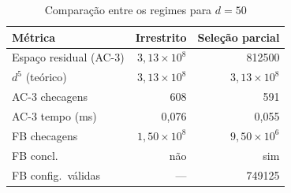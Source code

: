 \begin{table}[htbp]
  \centering
  \caption{Comparação entre os regimes para $d = 50$}
  \label{tab:bench-comparativa}
  \begin{tabular}{lrr}
    \toprule
    Métrica                & Irrestrito           & Seleção parcial      \\
    \midrule
    Espaço residual (AC-3) & $3{,}13\times10^{8}$ & 812500               \\
    $d^5$ (teórico)        & $3{,}13\times10^{8}$ & $3{,}13\times10^{8}$ \\
    AC-3 checagens         & 608                  & 591                  \\
    AC-3 tempo (ms)        & 0,076                & 0,055                \\
    FB checagens           & $1{,}50\times10^{8}$ & $9{,}50\times10^{6}$ \\
    FB concl.              & não                  & sim                  \\
    FB config.\ válidas    & ---                  & 749125               \\
    \bottomrule
  \end{tabular}
\end{table}